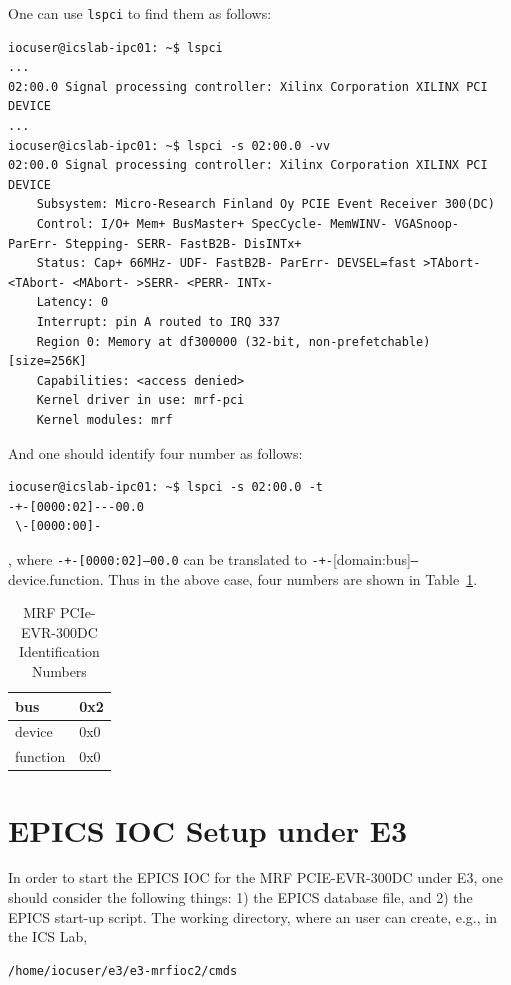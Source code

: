\documentclass[11pt
  , a4paper
  , article
  , oneside
  , showtrims
]{memoir}
\begin{document}
{One can use \texttt{lspci} to find them as follows:
\begin{lstlisting}[style=termstyle]
iocuser@icslab-ipc01: ~$ lspci
...
02:00.0 Signal processing controller: Xilinx Corporation XILINX PCI DEVICE
...
iocuser@icslab-ipc01: ~$ lspci -s 02:00.0 -vv
02:00.0 Signal processing controller: Xilinx Corporation XILINX PCI DEVICE
	Subsystem: Micro-Research Finland Oy PCIE Event Receiver 300(DC)
	Control: I/O+ Mem+ BusMaster+ SpecCycle- MemWINV- VGASnoop- ParErr- Stepping- SERR- FastB2B- DisINTx+
	Status: Cap+ 66MHz- UDF- FastB2B- ParErr- DEVSEL=fast >TAbort- <TAbort- <MAbort- >SERR- <PERR- INTx-
	Latency: 0
	Interrupt: pin A routed to IRQ 337
	Region 0: Memory at df300000 (32-bit, non-prefetchable) [size=256K]
	Capabilities: <access denied>
	Kernel driver in use: mrf-pci
	Kernel modules: mrf

\end{lstlisting}

And one should identify four number as follows:
\begin{lstlisting}[style=termstyle]
iocuser@icslab-ipc01: ~$ lspci -s 02:00.0 -t
-+-[0000:02]---00.0
 \-[0000:00]-
\end{lstlisting}
, where \texttt{-+-[0000:02]---00.0} can be translated to \texttt{-+-}[domain:bus]\texttt{---}device.function. Thus in the above case, four numbers are shown in Table~\ref{table:pciidnumber}.\begin{table}[!htb]
  \centering
  \begin{tabular}{l|l}
    \toprule
    bus      & 0x2 \\\midrule
    device   & 0x0 \\\midrule
    function & 0x0 \\\bottomrule
  \end{tabular}
  \caption[]{MRF PCIe-EVR-300DC Identification Numbers}
  \label{table:pciidnumber}
\end{table}


\clearpage
\section{EPICS IOC Setup under E3}
In order to start the EPICS IOC for the MRF PCIE-EVR-300DC under E3, one should consider the following things: 1) the EPICS database file, and 2) the EPICS start-up script. The working directory, where an user can create, e.g., in the ICS Lab,
\begin{lstlisting}[style=termstyle, label={list:pwd}, caption={Working Directory in the ICS lab.} ]
/home/iocuser/e3/e3-mrfioc2/cmds
\end{lstlisting}

}
\end{document}
